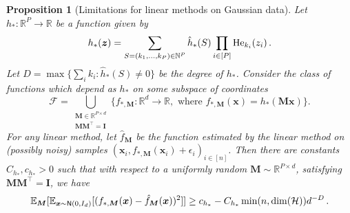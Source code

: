 \documentclass[11pt]{article}
\newcommand{\E}{\mathbb{E}}
\newcommand{\R}{\mathbb{R}}
\newcommand{\N}{\mathbb{N}}
\newcommand{\<}{\langle}
\renewcommand{\>}{\rangle}
\newtheorem{proposition}{Proposition}
\theoremstyle{definition}
\def\bI{{\boldsymbol I}}
\def\bM{{\boldsymbol M}}
\def\bx{{\boldsymbol x}}
\def\bz{{\boldsymbol z}}
\def\hf{{\hat f}}
\def\cF{{\mathcal F}}
\def\cH{{\mathcal H}}
\def\normal{{\sf N}}
\def\normal{{\sf N}}
\def\normal{{\sf N}}
\def\bz{{\boldsymbol z}}
\def\He{{\rm He}}
\def\bx{{\boldsymbol x}}
\def\cF{{\mathcal F}}
\def\bz{{\boldsymbol z}}
\def\He{{\rm He}}
\def\normal{{\sf N}}
\def\hf{\hat f}
\def\cH{\mathcal{H}}
\begin{document}
\begin{proposition}[Limitations for linear methods on Gaussian data]\label{prop:degree-linear-gaussian}
Let $h_* : \R^P \to \R$ be a function given by
\begin{align*}
h_*(\bz) = \sum_{S = (k_1,\ldots,k_P) \in \N^P} \hat{h}_*(S) \prod_{i \in [P]} \He_{k_i}(z_i)\,.
\end{align*}
Let $D = \max \{\sum_{i} k_i : \hat{h}_*(S) \neq 0\}$ be the degree of $h_*$.
Consider the class of functions which depend as $h_*$ on some subspace of coordinates $$\cF = \bigcup_{\substack{\bM \in \R^{P \times d} \\ \bM\bM^\top = \bI}}\{f_{*,\bM} : \R^d \to \R, \mbox{ where } f_{*,\bM}(\bx) = h_*(\bM\bx)\}.$$
For any linear method, let $\hf_{\bM}$ be the function estimated by the linear method on (possibly noisy) samples $(\bx_i,f_{*,\bM}(\bx_i) + \epsilon_i)_{i \in [n]}$. Then there are constants $C_{h_*},c_{h_*} > 0$ such that with respect to a uniformly random $\bM \sim \R^{P \times d}$, satisfying $\bM\bM^{\top} = \bI$, we have
\begin{align*}
\E_{\bM}[\E_{\bx \sim \normal(0,I_d)}[(f_{*,\bM}(\bx) - \hat{f}_{\bM}(\bx))^2]] \geq c_{h_*} - C_{h_*} \min(n,\dim(\cH))d^{-D}\,.
\end{align*}
\end{proposition}
\end{document}
